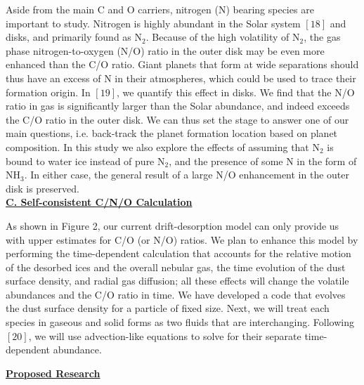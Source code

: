 \documentclass[12pt, letterpaper]{article}
\begin{document}
Aside from the main C and O carriers, nitrogen (N) bearing species are important to study. Nitrogen is highly abundant in the Solar system $[18]$ and disks, and primarily found as N$_2$. Because of the high volatility of N$_2$, the gas phase nitrogen-to-oxygen (N/O) ratio in the outer disk may be even more enhanced than the C/O ratio. Giant planets that form at wide separations should thus have an excess of N in their atmospheres, which could be used to trace their formation origin. In $[19]$, we quantify this effect in disks. We find that the N/O ratio in gas is significantly larger than the Solar abundance, and indeed exceeds the C/O ratio in the outer disk. We can thus set the stage to answer one of our main questions, i.e. back-track the planet formation location based on planet composition. In this study we also explore the effects of assuming that N$_2$ is bound to water ice instead of pure N$_2$, and the presence of some N in the form of NH$_3$. In either case, the general result of a large N/O enhancement in the outer disk is preserved. \\
\underline{\textbf{C. Self-consistent C/N/O Calculation}}

As shown in Figure 2, our current drift-desorption model can only provide us with upper estimates for C/O (or N/O) ratios. We plan to enhance this model by performing the time-dependent calculation that accounts for the relative motion of the desorbed ices and the overall nebular gas, the time evolution of the dust surface density,  and radial gas diffusion; all these effects will change the volatile abundances and the C/O ratio in time. We have developed a code that evolves the dust surface density for a particle of fixed size. Next, we will treat  each species in gaseous and solid forms as two fluids that are interchanging. Following $[20]$, we will use advection-like equations to solve for their separate time-dependent abundance. 

\noindent \underline{\textbf{Proposed Research}}
\end{document}
